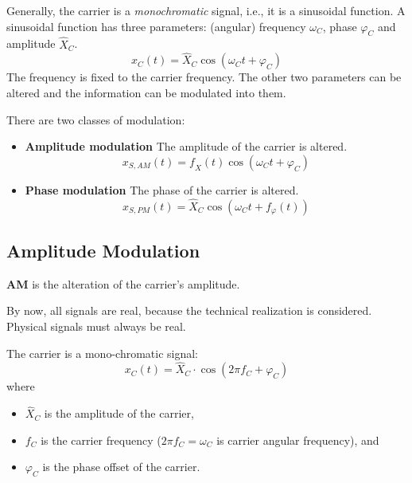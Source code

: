 \begin{refsection}
Generally, the carrier is a \emph{monochromatic} signal, i.e., it is a sinusoidal function. A sinusoidal function has three parameters: (angular) frequency $\omega_C$, phase $\varphi_C$ and amplitude $\hat{X}_C$.
\begin{equation}
	x_C(t) = \hat{X}_C \cos\left(\omega_C t + \varphi_C\right)
	\label{eq:ch05:carrier_timedomain}
\end{equation}
The frequency is fixed to the carrier frequency. The other two parameters can be altered and the information can be modulated into them.

There are two classes of modulation:
\begin{itemize}
	\item \textbf{Amplitude modulation} The amplitude of the carrier is altered.
	\begin{equation}
		x_{S,AM}(t) = f_{\hat{X}}(t) \cos\left(\omega_C t + \varphi_C\right)
	\end{equation}
	\item \textbf{Phase modulation} The phase of the carrier is altered.
	\begin{equation}
		x_{S,PM}(t) = \hat{X}_C \cos\left(\omega_C t + f_{\varphi}(t)\right)
	\end{equation}
\end{itemize}

\subsection{Amplitude Modulation}

 \textbf{\ac{AM}} is the alteration of the carrier's amplitude.

\begin{attention}
	By now, all signals are real, because the technical realization is considered. Physical signals must always be real.
\end{attention}

The carrier is a mono-chromatic signal:
\begin{equation}
	x_C(t) = \hat{X}_C \cdot \cos\left(2\pi f_C + \varphi_C\right)
\end{equation}
where
\begin{itemize}
	\item $\hat{X}_C$ is the amplitude of the carrier,
	\item $f_C$ is the carrier frequency ($2\pi f_C = \omega_C$ is carrier angular frequency), and
	\item $\varphi_C$ is the phase offset of the carrier.
\end{itemize}


\end{refsection}
